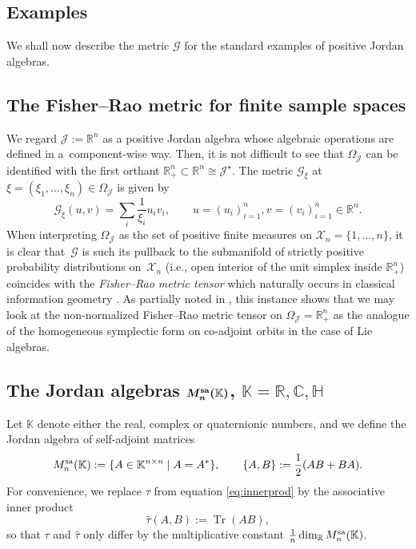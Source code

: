\documentclass[10pt,a4paper]{amsart}
\numberwithin{equation}{section}
\newcommand{\Jcal}{\mathcal{J}}
\newcommand{\R}{{\mathbb R}}
\newcommand{\C}{{\mathbb C}}
\newcommand{\bH}{{\mathbb H}}
\newcommand{\K}{{\mathbb K}}
\newcommand{\Gcal}{\mathcal{G}}
\begin{document}
\subsection{Examples} \label{subsec: examples}

We shall now describe the metric $\Gcal$ for the standard examples of positive Jordan algebras.


\subsection{The Fisher--Rao metric for finite sample spaces}\label{Ex: F-R}

We regard $\Jcal := \R^n $ {as a positive Jordan algebra whose algebraic operations are defined in a~component-wise way.
Then, it is not difficult to see that $\Omega_\Jcal$ can be identified with the first orthant $\R^n_+ \subset \R^{n}\cong \Jcal^\star$.}
The metric $\Gcal_\xi$ at $\xi = (\xi_1, \dots, \xi_n) \in \Omega_\Jcal$ is given by
\[
\Gcal_\xi(u, v) = \sum_i \dfrac1{\xi_i} u_i v_i, \qquad u = (u_i)_{i=1}^n, v = (v_i)_{i=1}^n \in \R^n.
\]
{When interpreting $\Omega_\Jcal$ as the set of positive finite measures on $\mathcal{X}_{n} = \{1, \dots, n\}$, it is clear that~$\Gcal$ {is such its pullback to the submanifold of strictly positive probability distributions on~$\mathcal{X}_{n}$ (i.e., open interior of the unit simplex inside $\R^n_+$) coincides with the {\em Fisher--Rao metric tensor }which naturally occurs in classical information geometry \cite{Amari-1985,A-J-L-S-2017}.}
As partially noted in \cite{C-J-S-2020-02,C-J-S-2020}, this instance shows that we may look at the non-normalized Fisher--Rao metric tensor on $\Omega_\Jcal = \R^n_+$ as the analogue of the homogeneous symplectic form on co-adjoint orbits in the case of Lie algebras.}

\subsection[The Jordan algebras M\_n\^{}\{sa\}(K), K = R, C, bH]{The Jordan algebras $\boldsymbol{ M_n^{\rm sa}(\K)}$, $\boldsymbol{\K = \R, \C, \bH}$}

Let $\K$ denote either the real, complex or quaternionic numbers, and we define the Jordan algebra of self-adjoint matrices
\[
M_n^{\rm sa}(\K) := \{ A \in \K^{n \times n} \mid A = A^\ast\}, \qquad \{A, B\} := \dfrac12 (AB + BA).
\]
For convenience, we replace $\tau$ from equation \eqref{eq:innerprod} by the associative inner product
\[
\hat \tau(A, B) := \operatorname{Tr}(AB),
\]
so that $\tau$ and $\hat \tau$ only differ by the multiplicative constant $\frac 1n \dim_\R M_n^{\rm sa}(\K)$.
\end{document}
